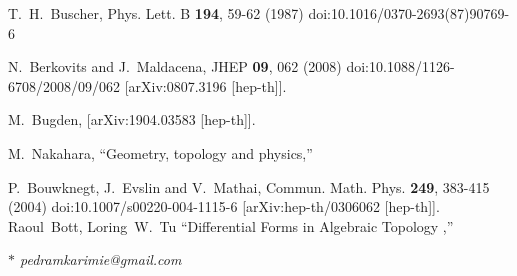 \documentclass[a4paper]{article}
\renewcommand{\cite}[1]{%
\begingroup
\def\tempx{0}%
  \StrCount{#1}{,}[\tempx]%
  \ifnum\tempx > 0 
  Refs. %
  \else
  Ref. %
  \fi
\endgroup
\origcite{#1}%
}
\begin{document}

 
\begin{thebibliography}{15}
T.~H.~Buscher,
Phys. Lett. B \textbf{194}, 59-62 (1987)
doi:10.1016/0370-2693(87)90769-6

N.~Berkovits and J.~Maldacena,
JHEP \textbf{09}, 062 (2008)
doi:10.1088/1126-6708/2008/09/062
[arXiv:0807.3196 [hep-th]].

M.~Bugden,
[arXiv:1904.03583 [hep-th]].

M.~Nakahara,
``Geometry, topology and physics,''

P.~Bouwknegt, J.~Evslin and V.~Mathai,
Commun. Math. Phys. \textbf{249}, 383-415 (2004)
doi:10.1007/s00220-004-1115-6
[arXiv:hep-th/0306062 [hep-th]].
Raoul~Bott, Loring~W.~Tu
``Differential Forms in Algebraic Topology ,''

\end{thebibliography}

\textsl{$*$ pedramkarimie@gmail.com}\\
\end{document}
